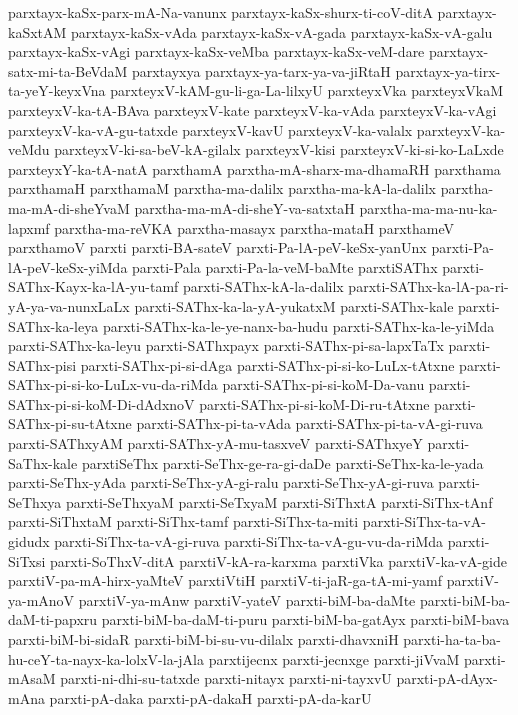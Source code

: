 {parxtayx-kaSx-parx-mA-Na-vanunx
parxtayx-kaSx-shurx-ti-coV-ditA
parxtayx-kaSxtAM
parxtayx-kaSx-vAda
parxtayx-kaSx-vA-gada
parxtayx-kaSx-vA-galu
parxtayx-kaSx-vAgi
parxtayx-kaSx-veMba
parxtayx-kaSx-veM-dare
parxtayx-satx-mi-ta-BeVdaM
parxtayxya
parxtayx-ya-tarx-ya-va-jiRtaH
parxtayx-ya-tirx-ta-yeY-keyxVna
parxteyxV-kAM-gu-li-ga-La-lilxyU
parxteyxVka
parxteyxVkaM
parxteyxV-ka-tA-BAva
parxteyxV-kate
parxteyxV-ka-vAda
parxteyxV-ka-vAgi
parxteyxV-ka-vA-gu-tatxde
parxteyxV-kavU
parxteyxV-ka-valalx
parxteyxV-ka-veMdu
parxteyxV-ki-sa-beV-kA-gilalx
parxteyxV-kisi
parxteyxV-ki-si-ko-LaLxde
parxteyxY-ka-tA-natA
parxthamA
parxtha-mA-sharx-ma-dhamaRH
parxthama
parxthamaH
parxthamaM
parxtha-ma-dalilx
parxtha-ma-kA-la-dalilx
parxtha-ma-mA-di-sheYvaM
parxtha-ma-mA-di-sheY-va-satxtaH
parxtha-ma-ma-nu-ka-lapxmf
parxtha-ma-reVKA
parxtha-masayx
parxtha-mataH
parxthameV
parxthamoV
parxti
parxti-BA-sateV
parxti-Pa-lA-peV-keSx-yanUnx
parxti-Pa-lA-peV-keSx-yiMda
parxti-Pala
parxti-Pa-la-veM-baMte
parxtiSAThx
parxti-SAThx-Kayx-ka-lA-yu-tamf
parxti-SAThx-kA-la-dalilx
parxti-SAThx-ka-lA-pa-ri-yA-ya-va-nunxLaLx
parxti-SAThx-ka-la-yA-yukatxM
parxti-SAThx-kale
parxti-SAThx-ka-leya
parxti-SAThx-ka-le-ye-nanx-ba-hudu
parxti-SAThx-ka-le-yiMda
parxti-SAThx-ka-leyu
parxti-SAThxpayx
parxti-SAThx-pi-sa-lapxTaTx
parxti-SAThx-pisi
parxti-SAThx-pi-si-dAga
parxti-SAThx-pi-si-ko-LuLx-tAtxne
parxti-SAThx-pi-si-ko-LuLx-vu-da-riMda
parxti-SAThx-pi-si-koM-Da-vanu
parxti-SAThx-pi-si-koM-Di-dAdxnoV
parxti-SAThx-pi-si-koM-Di-ru-tAtxne
parxti-SAThx-pi-su-tAtxne
parxti-SAThx-pi-ta-vAda
parxti-SAThx-pi-ta-vA-gi-ruva
parxti-SAThxyAM
parxti-SAThx-yA-mu-tasxveV
parxti-SAThxyeY
parxti-SaThx-kale
parxtiSeThx
parxti-SeThx-ge-ra-gi-daDe
parxti-SeThx-ka-le-yada
parxti-SeThx-yAda
parxti-SeThx-yA-gi-ralu
parxti-SeThx-yA-gi-ruva
parxti-SeThxya
parxti-SeThxyaM
parxti-SeTxyaM
parxti-SiThxtA
parxti-SiThx-tAnf
parxti-SiThxtaM
parxti-SiThx-tamf
parxti-SiThx-ta-miti
parxti-SiThx-ta-vA-gidudx
parxti-SiThx-ta-vA-gi-ruva
parxti-SiThx-ta-vA-gu-vu-da-riMda
parxti-SiTxsi
parxti-SoThxV-ditA
parxtiV-kA-ra-karxma
parxtiVka
parxtiV-ka-vA-gide
parxtiV-pa-mA-hirx-yaMteV
parxtiVtiH
parxtiV-ti-jaR-ga-tA-mi-yamf
parxtiV-ya-mAnoV
parxtiV-ya-mAnw
parxtiV-yateV
parxti-biM-ba-daMte
parxti-biM-ba-daM-ti-papxru
parxti-biM-ba-daM-ti-puru
parxti-biM-ba-gatAyx
parxti-biM-bava
parxti-biM-bi-sidaR
parxti-biM-bi-su-vu-dilalx
parxti-dhavxniH
parxti-ha-ta-ba-hu-ceY-ta-nayx-ka-lolxV-la-jAla
parxtijecnx
parxti-jecnxge
parxti-jiVvaM
parxti-mAsaM
parxti-ni-dhi-su-tatxde
parxti-nitayx
parxti-ni-tayxvU
parxti-pA-dAyx-mAna
parxti-pA-daka
parxti-pA-dakaH
parxti-pA-da-karU
}
